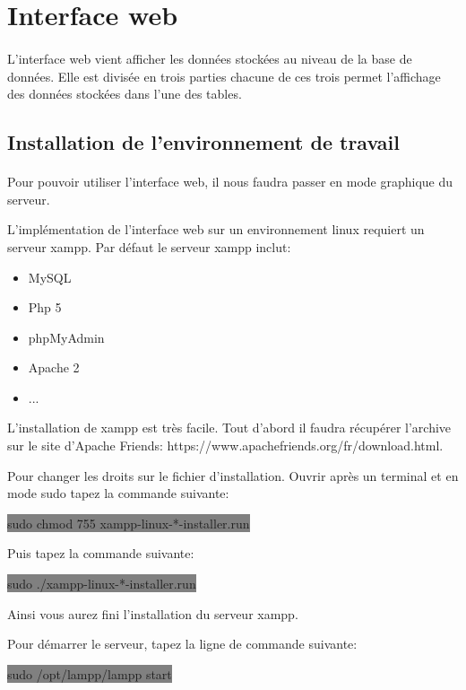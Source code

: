 \documentclass[11pt,a4paper,titlepage, oneside]{article}
\begin{document}
\newpage
\section{{\color{red} Interface web}}
\paragraph{}
L'interface web vient afficher les données stockées au niveau de la base de données. Elle est divisée en trois parties chacune de ces trois permet l'affichage des données stockées dans l'une des tables.

\subsection{{\color{blue}Installation de l'environnement de travail}}
\paragraph{}
	Pour pouvoir utiliser l'interface web, il nous faudra passer en mode graphique du serveur.
	
	L'implémentation de l'interface web sur un environnement linux requiert un serveur xampp. Par défaut le serveur xampp inclut: \begin{itemize}
	\item{MySQL}
	\item{Php 5}
	\item{phpMyAdmin}
	\item{Apache 2}
	\item{...}
	\end{itemize}
	
	L'installation de xampp est très facile. Tout d'abord il faudra récupérer l'archive sur le site d'Apache Friends: https://www.apachefriends.org/fr/download.html.
	
	Pour changer les droits sur le fichier d'installation. Ouvrir après un terminal et en mode sudo tapez la commande suivante:
	
	\colorbox{gray}{sudo chmod 755 xampp-linux-*-installer.run}
	
	Puis tapez la commande suivante:
	
	\colorbox{gray}{sudo ./xampp-linux-*-installer.run}
	
	Ainsi vous aurez fini l'installation du serveur xampp.
	
	Pour démarrer le serveur, tapez la ligne de commande suivante: 
	
	\colorbox{gray}{sudo /opt/lampp/lampp start}
	
\end{document}
